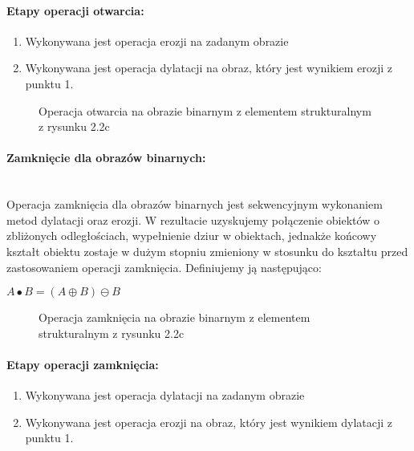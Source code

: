\documentclass[a4paper,12pt,twoside,openany]{report}
\newcommand{\ImgPath}{.}
\begin{document}
\paragraph{Etapy operacji otwarcia:}
\begin{enumerate}
	\item Wykonywana jest operacja erozji na zadanym obrazie
	\item Wykonywana jest operacja dylatacji na obraz, który jest wynikiem erozji z punktu 1.
\end{enumerate}

\begin{figure}[H]
	\centering
	\caption{Operacja otwarcia na obrazie binarnym z elementem strukturalnym z rysunku 2.2c}
\end{figure}

\paragraph{Zamknięcie dla obrazów binarnych:}\mbox{} \\
\indent Operacja zamknięcia dla obrazów binarnych jest sekwencyjnym wykonaniem metod dylatacji oraz erozji. W rezultacie uzyskujemy połączenie obiektów o zbliżonych odległościach, wypełnienie dziur w obiektach, jednakże końcowy kształt obiektu zostaje w dużym stopniu zmieniony w stosunku do kształtu przed zastosowaniem operacji zamknięcia. Definiujemy ją następująco:
\begin{center}
	$ A \bullet B = (A \oplus B) \ominus B $ 
\end{center}

\begin{figure}[H]
	\centering
	\caption{Operacja zamknięcia na obrazie binarnym z elementem strukturalnym z rysunku 2.2c}
\end{figure}

\paragraph{Etapy operacji zamknięcia:}
\begin{enumerate}
	\item Wykonywana jest operacja dylatacji na zadanym obrazie
	\item Wykonywana jest operacja erozji na obraz, który jest wynikiem dylatacji z punktu 1.
\end{enumerate}
\end{document}
